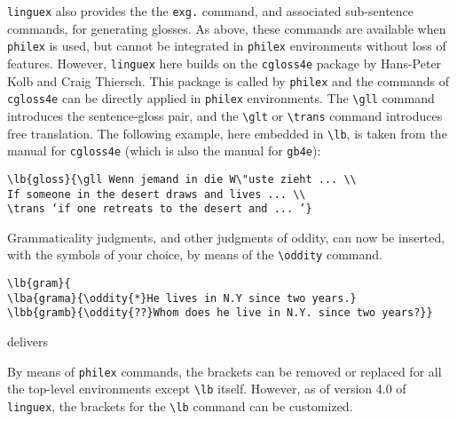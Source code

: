 \documentclass[11pt]{article}
\begin{document}

\verb+linguex+ also  provides the the \verb+exg.+ command, and associated sub-sentence commands, for generating glosses. As above, these commands are available when \verb+philex+ is used, but cannot be integrated in \verb+philex+ environments without loss of features. However, \verb+linguex+ here builds on the \verb+cgloss4e+ package by Hans-Peter Kolb and Craig Thiersch. This package is called by \verb+philex+ and the commands of \verb+cgloss4e+ can be directly applied in \verb+philex+ environments. The \verb+\gll+ command introduces the sentence-gloss pair, and the \verb+\glt+ or \verb+\trans+ command introduces free translation. The following example, here embedded in \verb+\lb+, is taken from the manual for \verb+cgloss4e+ (which is also the manual for \verb+gb4e+):

\begin{verbatim}
\lb{gloss}{\gll Wenn jemand in die W\"uste zieht ... \\
If someone in the desert draws and lives ... \\
\trans ‘if one retreats to the desert and ... ’}
\end{verbatim}


Grammaticality judgments,  and other judgments of oddity, can now be inserted, with the symbols of your choice, by means of the \verb+\oddity+ command. 

\begin{verbatim}
\lb{gram}{
\lba{grama}{\oddity{*}He lives in N.Y since two years.}
\lbb{gramb}{\oddity{??}Whom does he live in N.Y. since two years?}}
\end{verbatim}%
% 
delivers
\newpage


By means of \verb+philex+ commands, the brackets can be  removed or replaced for all the top-level environments except \verb+\lb+ itself. However, as of version 4.0 of \verb+linguex+, the brackets for the \verb+\lb+ command can be customized. 
\end{document}
